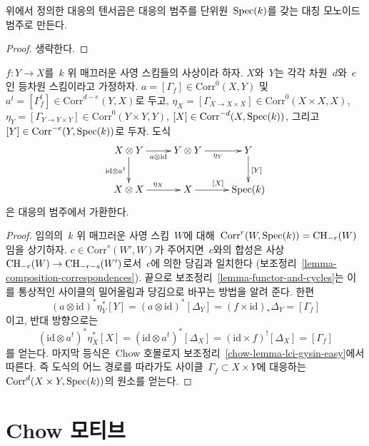 \begin{lemma}
\label{lemma-tensor-product}
위에서 정의한 대응의 텐서곱은 대응의 범주를 단위원\ 
$\mathop{\mathrm{Spec}}(k)$를 갖는 대칭 모노이드 범주로 만든다.
\end{lemma}

\begin{proof}
생략한다.
\end{proof}

\begin{lemma}
\label{lemma-prep-dual}
$f : Y \to X$를\  $k$ 위 매끄러운 사영 스킴들의 사상이라 하자.
$X$와\  $Y$는 각각 차원\  $d$와\  $e$인 등차원 스킴이라고 가정하자.
$a = [\Gamma_f] \in \text{Corr}^0(X, Y)$ 및\ 
$a^t = [\Gamma_f^t] \in \text{Corr}^{d - e}(Y, X)$로 두고,
$\eta_X = [\Gamma_{X \to X \times X}] \in \text{Corr}^0(X \times X, X)$,
$\eta_Y = [\Gamma_{Y \to Y \times Y}] \in \text{Corr}^0(Y \times Y, Y)$,
$[X] \in \text{Corr}^{-d}(X, \mathop{\mathrm{Spec}}(k))$, 그리고\ 
$[Y] \in \text{Corr}^{-e}(Y, \mathop{\mathrm{Spec}}(k))$로 두자. 도식
$$
\xymatrix{
X \otimes Y \ar[r]_{a \otimes \text{id}} \ar[d]_{\text{id} \otimes a^t} &
Y \otimes Y \ar[r]_{\eta_Y} &
Y \ar[d]^{[Y]} \\
X \otimes X \ar[r]^{\eta_X} &
X \ar[r]^{[X]} &
\Spec(k)
}
$$
은 대응의 범주에서 가환한다.
\end{lemma}

\begin{proof}
임의의\  $k$ 위 매끄러운 사영 스킴\  $W$에 대해\ 
$\text{Corr}^r(W, \mathop{\mathrm{Spec}}(k)) = \mathop{\mathrm{CH}}\nolimits_{-r}(W)$임을 상기하자.
$c \in \text{Corr}^s(W', W)$가 주어지면\  $c$와의 합성은 사상\ 
$\mathop{\mathrm{CH}}\nolimits_{-r}(W) \to \mathop{\mathrm{CH}}\nolimits_{-r - s}(W')$로서\  $c$에 의한 당김과 일치한다
(보조정리\  \ref{lemma-composition-correspondences}).
끝으로 보조정리\  \ref{lemma-functor-and-cycles}는 이를 통상적인
사이클의 밀어올림과 당김으로 바꾸는 방법을 알려 준다.
한편
$$
(a \otimes \text{id})^* \eta_Y^* [Y] =
(a \otimes \text{id})^* [\Delta_Y] =
(f \times \text{id})_*\Delta_Y = [\Gamma_f]
$$
이고, 반대 방향으로는
$$
(\text{id} \otimes a^t)^* \eta_X^* [X] =
(\text{id} \otimes a^t)^* [\Delta_X] =
(\text{id} \times f)^![\Delta_X] = [\Gamma_f]
$$
를 얻는다. 마지막 등식은\  Chow 호몰로지 보조정리\ 
\ref{chow-lemma-lci-gysin-easy}에서 따른다.
즉 도식의 어느 경로를 따라가도 사이클\ 
$\Gamma_f \subset X \times Y$에 대응하는\ 
$\text{Corr}^d(X \times Y, \mathop{\mathrm{Spec}}(k))$의 원소를 얻는다.
\end{proof}






\section{Chow 모티브}
\label{section-chow-motives}

